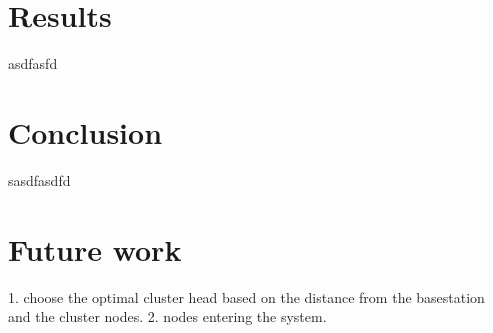 \documentclass{acm_proc_article-sp}
\begin{document}
\section{Results}
\vspace{1 mm}

asdfasfd

\section{Conclusion}
\vspace{1 mm}

sasdfasdfd

\section{Future work}
\vspace{1 mm}

1. choose the optimal cluster head based on the distance from the basestation and the cluster nodes.
2. nodes entering the system.
\end{document}
